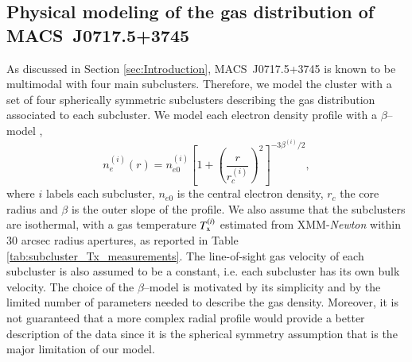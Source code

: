 \documentclass[twocolumn,traditabstract]{aa}
\begin{document}
\subsection{Physical modeling of the gas distribution of \mbox{MACS~J0717.5+3745}}\label{sec:Physical_modeling_of_the_gas_distribution}
As discussed in Section \ref{sec:Introduction}, \mbox{MACS~J0717.5+3745} is known to be multimodal with four main subclusters. Therefore, we model the cluster with a set of four spherically symmetric subclusters describing the gas distribution associated to each subcluster. We model each electron density profile with a $\beta$--model \citep{Cavaliere1978},
\begin{equation}
	n_e^{(i)}(r) = n_{e0}^{(i)} \left[1+\left(\frac{r}{r_c^{(i)}}\right)^2 \right]^{-3 \beta^{(i)} /2},
\label{eq:beta_model}
\end{equation}
where $i$ labels each subcluster, $n_{e0}$ is the central electron density, $r_c$ the core radius and $\beta$ is the outer slope of the profile. We also assume that the subclusters are isothermal, with a gas temperature $T_{\rm x}^{(i)}$ estimated from XMM-\textit{Newton} within 30 arcsec radius apertures, as reported in Table \ref{tab:subcluster_Tx_measurements}. The line-of-sight gas velocity of each subcluster is also assumed to be a constant, i.e. each subcluster has its own bulk velocity. The choice of the $\beta$--model is motivated by its simplicity and by the limited number of parameters needed to describe the gas density. Moreover, it is not guaranteed that a more complex radial profile would provide a better description of the data since it is the spherical symmetry assumption that is the major limitation of our model.
\end{document}

